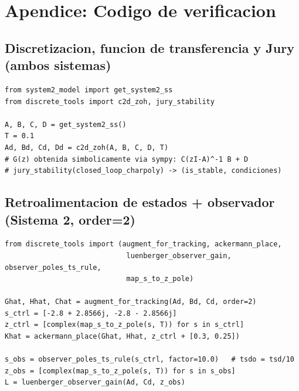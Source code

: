 \documentclass[11pt]{article}
\begin{document}
\section*{Apendice: Codigo de verificacion}

\subsection*{Discretizacion, funcion de transferencia y Jury (ambos sistemas)}
\begin{lstlisting}
from system2_model import get_system2_ss
from discrete_tools import c2d_zoh, jury_stability

A, B, C, D = get_system2_ss()
T = 0.1
Ad, Bd, Cd, Dd = c2d_zoh(A, B, C, D, T)
# G(z) obtenida simbolicamente via sympy: C(zI-A)^-1 B + D
# jury_stability(closed_loop_charpoly) -> (is_stable, condiciones)
\end{lstlisting}

\subsection*{Retroalimentacion de estados + observador (Sistema 2, order=2)}
\begin{lstlisting}
from discrete_tools import (augment_for_tracking, ackermann_place,
                             luenberger_observer_gain, observer_poles_ts_rule,
                             map_s_to_z_pole)

Ghat, Hhat, Chat = augment_for_tracking(Ad, Bd, Cd, order=2)
s_ctrl = [-2.8 + 2.8566j, -2.8 - 2.8566j]
z_ctrl = [complex(map_s_to_z_pole(s, T)) for s in s_ctrl]
Khat = ackermann_place(Ghat, Hhat, z_ctrl + [0.3, 0.25])

s_obs = observer_poles_ts_rule(s_ctrl, factor=10.0)   # tsdo = tsd/10
z_obs = [complex(map_s_to_z_pole(s, T)) for s in s_obs]
L = luenberger_observer_gain(Ad, Cd, z_obs)
\end{lstlisting}
\end{document}
